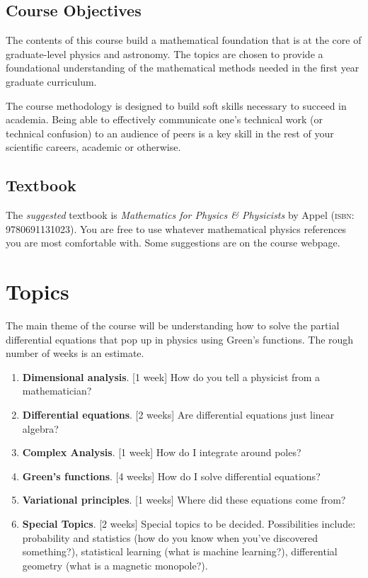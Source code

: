 \documentclass[12pt]{article}
\numberwithin{equation}{section}    %
\begin{document}
\subsection*{Course Objectives}

The contents of this course build a mathematical foundation that is at the core of graduate-level physics and astronomy. The topics are chosen to provide a foundational understanding of the mathematical methods needed in the first year graduate curriculum.

The course methodology is designed to build soft skills necessary to succeed in academia. Being able to effectively communicate one's technical work (or technical confusion) to an audience of peers is a key skill in the rest of your scientific careers, academic or otherwise. 


\subsection*{Textbook}

The \emph{suggested} textbook is \emph{Mathematics for Physics \& Physicists} by Appel (\textsc{isbn}: 9780691131023). You are free to use whatever mathematical physics references you are most comfortable with. Some suggestions are on the course webpage.

\section*{Topics}

The main theme of the course will be understanding how to solve the partial differential equations that pop up in physics using Green's functions. The rough number of weeks is an estimate.

\begin{enumerate}
	\item \textbf{Dimensional analysis}. [1 week] How do you tell a physicist from a mathematician?
	\item \textbf{Differential equations}. [2 weeks] Are differential equations just linear algebra?
	\item \textbf{Complex Analysis}. [1 week] How do I integrate around poles?
	\item \textbf{Green's functions}. [4 weeks] How do I solve differential equations? 
	\item \textbf{Variational principles}. [1 weeks] Where did these equations come from? 
	\item \textbf{Special Topics}. [2 weeks]  Special topics to be decided. Possibilities include: probability and statistics (how do you know when you've discovered something?), statistical learning (what is machine learning?), differential geometry (what is a magnetic monopole?).
\end{enumerate}
\end{document}
